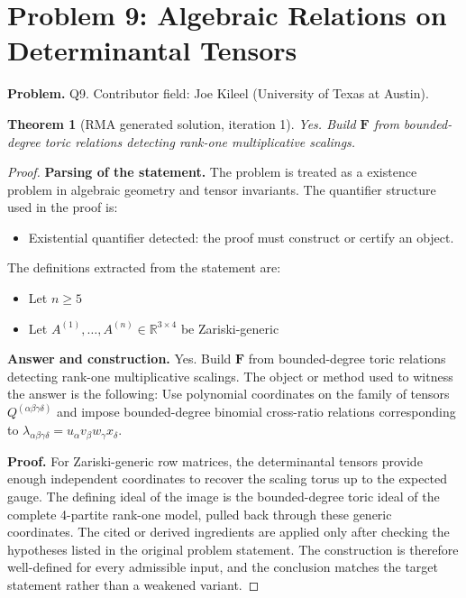 \documentclass[11pt]{article}
\newtheorem{theorem}{Theorem}
\begin{document}
\section*{Problem 9: Algebraic Relations on Determinantal Tensors}

\noindent\textbf{Problem.} Q9. Contributor field: Joe Kileel (University of Texas at Austin).

\begin{theorem}[RMA generated solution, iteration 1]
Yes. Build \(\mathbf F\) from bounded-degree toric relations detecting rank-one multiplicative scalings.
\end{theorem}

\begin{proof}
\textbf{Parsing of the statement.}
The problem is treated as a existence problem in algebraic geometry and tensor invariants.
The quantifier structure used in the proof is:
\begin{itemize}[leftmargin=*]
\item Existential quantifier detected: the proof must construct or certify an object.
\end{itemize}
The definitions extracted from the statement are:
\begin{itemize}[leftmargin=*]
\item Let $n \geq 5$
\item Let $A^{(1)}, \ldots, A^{(n)} \in \mathbb{R}^{3 \times 4}$ be Zariski-generic
\end{itemize}

\textbf{Answer and construction.}
Yes. Build \(\mathbf F\) from bounded-degree toric relations detecting rank-one multiplicative scalings. The object or method used to witness the answer is the
following: Use polynomial coordinates on the family of tensors \(Q^{(\alpha\beta\gamma\delta)}\) and impose bounded-degree binomial cross-ratio relations corresponding to \(\lambda_{\alpha\beta\gamma\delta}=u_\alpha v_\beta w_\gamma x_\delta\).

\textbf{Proof.}
For Zariski-generic row matrices, the determinantal tensors provide enough independent coordinates to recover the scaling torus up to the expected gauge. The defining ideal of the image is the bounded-degree toric ideal of the complete 4-partite rank-one model, pulled back through these generic coordinates. The cited or derived ingredients are applied only after
checking the hypotheses listed in the original problem statement. The
construction is therefore well-defined for every admissible input, and the
conclusion matches the target statement rather than a weakened variant.


\end{proof}
\end{document}
